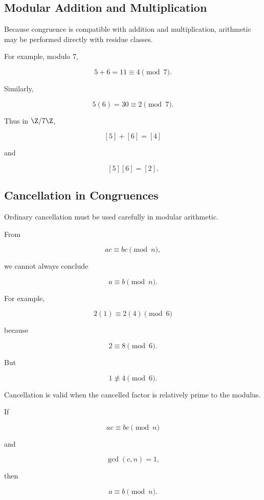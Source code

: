 \subsection{Modular Addition and Multiplication}
\label{subsec:modular-addition-multiplication}

Because congruence is compatible with addition and multiplication, arithmetic
may be performed directly with residue classes.

For example, modulo \(7\),

\[ 5+6=11\equiv4\pmod7. \]

Similarly,

\[ 5(6)=30\equiv2\pmod7. \]

Thus in \(\Z/7\Z\),

\[ [5]+[6]=[4] \]

and

\[ [5][6]=[2]. \]

\subsection{Cancellation in Congruences}
\label{subsec:congruence-cancellation}

Ordinary cancellation must be used carefully in modular arithmetic.

From

\[ ac\equiv bc\pmod n, \]

we cannot always conclude

\[ a\equiv b\pmod n. \]

For example,

\[ 2(1)\equiv2(4)\pmod6 \]

because

\[ 2\equiv8\pmod6. \]

But

\[ 1\not\equiv4\pmod6. \]

Cancellation is valid when the cancelled factor is relatively prime to the
modulus.

\begin{theorem}
If

\[ ac\equiv bc\pmod n \]

and

\[ \gcd(c,n)=1, \]

then

\[ a\equiv b\pmod n. \]
\end{theorem}

